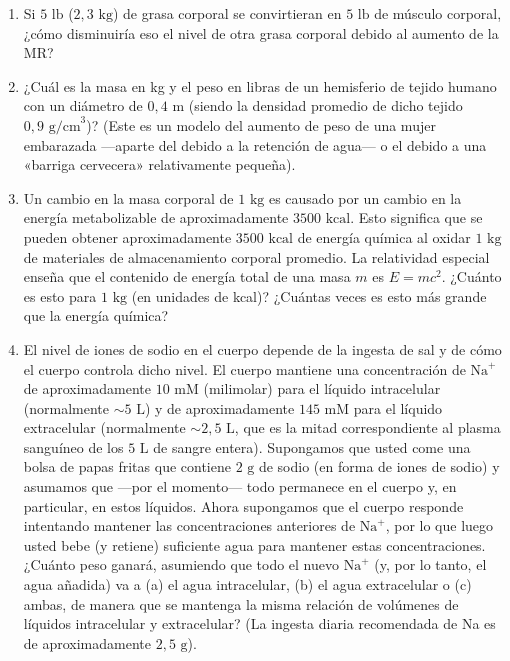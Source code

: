\documentclass[12pt]{book}
\begin{document}
\begin{enumerate}
\item[6.91] Si $5\text{ lb}$ ($2{,}3\text{ kg}$) de grasa corporal se convirtieran en $5\text{ lb}$ de músculo corporal, ¿cómo disminuiría eso el nivel de otra grasa corporal debido al aumento de la MR?

\item[6.92] ¿Cuál es la masa en kg y el peso en libras de un hemisferio de tejido humano con un diámetro de $0{,}4\text{ m}$ (siendo la densidad promedio de dicho tejido $0{,}9\text{ g/cm}^3$)? (Este es un modelo del aumento de peso de una mujer embarazada ---aparte del debido a la retención de agua--- o el debido a una «barriga cervecera» relativamente pequeña).

\item[6.93] Un cambio en la masa corporal de $1\text{ kg}$ es causado por un cambio en la energía metabolizable de aproximadamente $3500\text{ kcal}$. Esto significa que se pueden obtener aproximadamente $3500\text{ kcal}$ de energía química al oxidar $1\text{ kg}$ de materiales de almacenamiento corporal promedio. La relatividad especial enseña que el contenido de energía total de una masa $m$ es $E = mc^2$. ¿Cuánto es esto para $1\text{ kg}$ (en unidades de kcal)? ¿Cuántas veces es esto más grande que la energía química?

\item[6.94] \label{prob:694} El nivel de iones de sodio en el cuerpo depende de la ingesta de sal y de cómo el cuerpo controla dicho nivel. El cuerpo mantiene una concentración de $\text{Na}^+$ de aproximadamente $10\text{ mM}$ (milimolar) para el líquido intracelular (normalmente $\sim 5\text{ L}$) y de aproximadamente $145\text{ mM}$ para el líquido extracelular (normalmente $\sim 2{,}5\text{ L}$, que es la mitad correspondiente al plasma sanguíneo de los $5\text{ L}$ de sangre entera). Supongamos que usted come una bolsa de papas fritas que contiene $2\text{ g}$ de sodio (en forma de iones de sodio) y asumamos que ---por el momento--- todo permanece en el cuerpo y, en particular, en estos líquidos. Ahora supongamos que el cuerpo responde intentando mantener las concentraciones anteriores de $\text{Na}^+$, por lo que luego usted bebe (y retiene) suficiente agua para mantener estas concentraciones. ¿Cuánto peso ganará, asumiendo que todo el nuevo $\text{Na}^+$ (y, por lo tanto, el agua añadida) va a (a) el agua intracelular, (b) el agua extracelular o (c) ambas, de manera que se mantenga la misma relación de volúmenes de líquidos intracelular y extracelular? (La ingesta diaria recomendada de Na es de aproximadamente $2{,}5\text{ g}$).


\end{enumerate}
\end{document}
